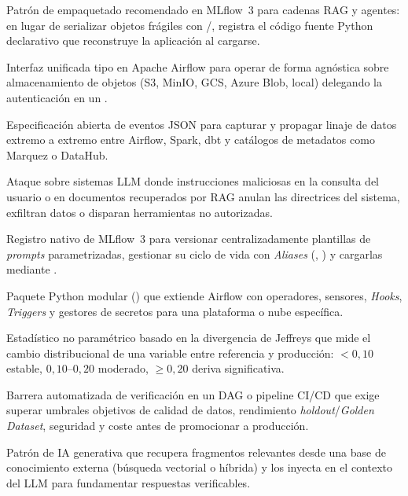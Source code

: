{\begin{description}[style=standard, itemsep=2pt, parsep=0pt, topsep=4pt, leftmargin=1.1em, font=\sffamily\bfseries\color{PrimaryDark}]
\item[Models from Code.]
Patrón de empaquetado recomendado en MLflow~3 para cadenas RAG y agentes: en lugar de serializar objetos frágiles con /, registra el código fuente Python declarativo que reconstruye la aplicación al cargarse.

\item[ObjectStoragePath.]
Interfaz unificada tipo  en Apache Airflow para operar de forma agnóstica sobre almacenamiento de objetos (S3, MinIO, GCS, Azure Blob, local) delegando la autenticación en un .

\item[OpenLineage.]
Especificación abierta de eventos JSON para capturar y propagar linaje de datos extremo a extremo entre Airflow, Spark, dbt y catálogos de metadatos como Marquez o DataHub.

\item[Prompt Injection.]
Ataque sobre sistemas LLM donde instrucciones maliciosas en la consulta del usuario o en documentos recuperados por RAG anulan las directrices del sistema, exfiltran datos o disparan herramientas no autorizadas.

\item[Prompt Registry.]
Registro nativo de MLflow~3 para versionar centralizadamente plantillas de \textit{prompts} parametrizadas, gestionar su ciclo de vida con \textit{Aliases} (, ) y cargarlas mediante .

\item[Provider (Airflow).]
Paquete Python modular () que extiende Airflow con operadores, sensores, \textit{Hooks}, \textit{Triggers} y gestores de secretos para una plataforma o nube específica.

\item[PSI (Population Stability Index).]
Estadístico no paramétrico basado en la divergencia de Jeffreys que mide el cambio distribucional de una variable entre referencia y producción: $<0{,}10$ estable, $0{,}10\text{--}0{,}20$ moderado, $\ge 0{,}20$ deriva significativa.

\item[Quality Gate.]
Barrera automatizada de verificación en un DAG o pipeline CI/CD que exige superar umbrales objetivos de calidad de datos, rendimiento \textit{holdout}/\textit{Golden Dataset}, seguridad y coste antes de promocionar a producción.

\item[RAG (Retrieval-Augmented Generation).]
Patrón de IA generativa que recupera fragmentos relevantes desde una base de conocimiento externa (búsqueda vectorial o híbrida) y los inyecta en el contexto del LLM para fundamentar respuestas verificables.


\end{description}}
